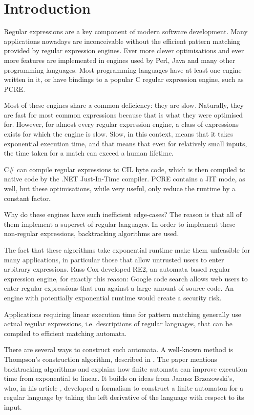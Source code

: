 \chapter{Introduction}

Regular expressions are a key component of modern software development. Many
applications nowadays are inconceivable without the efficient pattern matching
provided by regular expression engines. Ever more clever optimisations and ever
more features are implemented in engines used by Perl, Java and many other
programming languages. Most programming languages have at least one engine
written in it, or have bindings to a popular C regular expression engine, such
as PCRE.

Most of these engines share a common deficiency: they are slow. Naturally, they
are fast for most common expressions because that is what they were optimised
for. However, for almost every regular expression engine, a class of expressions
exists for which the engine is slow. Slow, in this context, means that it takes
exponential execution time, and that means that even for relatively small
inputs, the time taken for a match can exceed a human lifetime.

C\# can compile regular expressions to CIL byte code, which is then compiled to
native code by the .NET Just-In-Time compiler. PCRE contains a JIT mode, as
well, but these optimisations, while very useful, only reduce the runtime by a
constant factor.

Why do these engines have such inefficient edge-cases? The reason is that all of
them implement a superset of regular languages. In order to implement these
non-regular expressions, backtracking algorithms are used.

The fact that these algorithms take exponential runtime make them unfeasible for
many applications, in particular those that allow untrusted users to enter
arbitrary expressions. Russ Cox developed RE2, an automata based regular
expression engine, for exactly this reason: Google code search allows web users
to enter regular expressions that run against a large amount of source code. An
engine with potentially exponential runtime would create a security risk.

Applications requiring linear execution time for pattern matching generally use
actual regular expressions, i.e. descriptions of regular languages, that can be
compiled to efficient matching automata.

There are several ways to construct such automata. A well-known method is
Thompson's construction algorithm, described in \cite{thompson}. The paper
mentions backtracking algorithms and explains how finite automata can improve
execution time from exponential to linear. It builds on ideas from Janusz
Brzozowski's, who, in his article \cite{brzozowski}, developed a formalism to
construct a finite automaton for a regular language by taking the left
derivative of the language with respect to its input.


